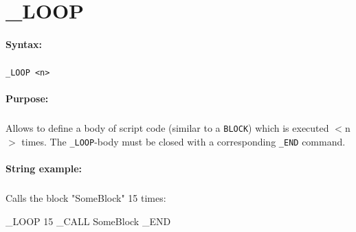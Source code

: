 
\newpage
\section{\_LOOP}
\label{cmd:_LOOP}

\paragraph{Syntax:}
\subparagraph{}
\texttt{\_LOOP <n>}

\paragraph{Purpose:}
\subparagraph{}
Allows to define a body of script code (similar to a \texttt{BLOCK}) which 
is executed $<$n$>$ times. The \texttt{\_LOOP}-body must be closed with a 
corresponding \texttt{\_END} command.

\paragraph{String example:}
\subparagraph{}
Calls the block "SomeBlock" 15 times:

\begin{usplisting}
    _LOOP 15
    _CALL SomeBlock
    _END
\end{usplisting}
